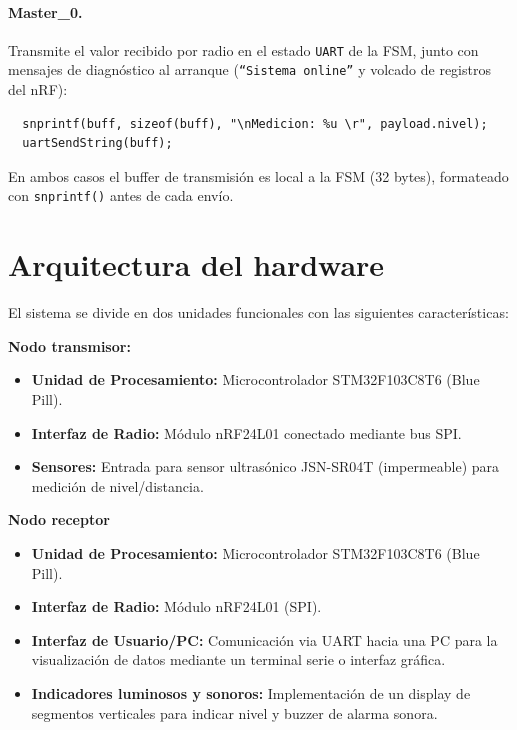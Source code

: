 \documentclass[12pt,a4paper]{article}
\begin{document}
  \paragraph{Master\_0.}
  Transmite el valor recibido por radio en el estado \texttt{UART} de la FSM,
  junto con mensajes de diagnóstico al arranque (\texttt{``Sistema online''} y  
  volcado de registros del nRF):
  \begin{verbatim}                                                              
  snprintf(buff, sizeof(buff), "\nMedicion: %u \r", payload.nivel);
  uartSendString(buff);
  \end{verbatim}                                                                
  
  En ambos casos el buffer de transmisión es local a la FSM (32 bytes),         
  formateado con \texttt{snprintf()} antes de cada envío.


\section{Arquitectura del hardware}

El sistema se divide en dos unidades funcionales con las siguientes características:

\textbf{Nodo transmisor: }

\begin{itemize}
	\item \textbf{Unidad de Procesamiento:} Microcontrolador STM32F103C8T6 (Blue Pill).
	\item \textbf{Interfaz de Radio:} Módulo nRF24L01 conectado mediante bus SPI.
	\item \textbf{Sensores:} Entrada para sensor ultrasónico JSN-SR04T (impermeable) para medición de nivel/distancia.
\end{itemize}

\textbf{Nodo receptor}

\begin{itemize}
	\item \textbf{Unidad de Procesamiento:} Microcontrolador STM32F103C8T6 (Blue Pill).
	\item \textbf{Interfaz de Radio:} Módulo nRF24L01 (SPI).
	\item \textbf{Interfaz de Usuario/PC:} Comunicación via UART hacia una PC para la visualización de datos mediante un terminal serie o interfaz gráfica.
	\item \textbf{Indicadores luminosos y sonoros:} Implementación de un display de segmentos verticales para indicar nivel y buzzer de alarma sonora.
\end{itemize}
\end{document}
